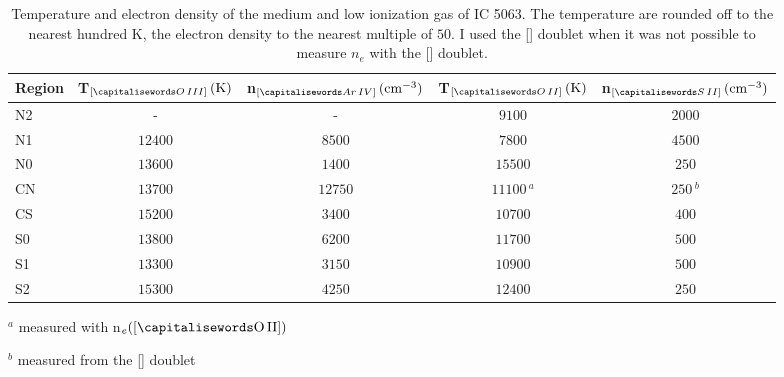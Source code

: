 \documentclass[../main.tex]{subfiles}
\begin{document}
\begin{table}
\caption[]{Temperature and electron density of the medium and low ionization gas of IC 5063. 
The temperature are rounded off to the nearest hundred K, the electron density to the nearest multiple of $50$. 
I used the [] doublet when it was not possible to measure $n_e$ with the [] doublet. }
\label{tab:ted_ic}
\centering
\begin{threeparttable}
\begin{tabular}{lcccc}
\hline
Region&T$_{[\ion{O}{III}]}\,(\si{K})$&n$_{[\ion{Ar}{IV}]}\,(\si{cm^{-3}})$&T$_{[\ion{O}{II}]}\,(\si{K})$&n$_{[\ion{S}{II}]}\,(\si{cm^{-3}})$\\
\hline
N2&-&-&$9100$&$2000$\\
N1&$12400$&$8500$&$7800$&$4500$\\
N0&$13600$&$1400$&$15500$&$250$\\
CN&$13700$&$12750$&$11100\,^a$&$250\,^b$\\
CS&$15200$&$3400$&$10700$&$400$\\
S0&$13800$&$6200$&$11700$&$500$\\
S1&$13300$&$3150$&$10900$&$500$\\
S2&$15300$&$4250$&$12400$&$250$\\
\hline
\end{tabular}
\begin{tablenotes}
\item $^a$ measured with n$_e([\rm \ion{O}{II}])$
\item $^b$ measured from the [] doublet
\end{tablenotes}
\end{threeparttable}
\end{table}
\end{document}
